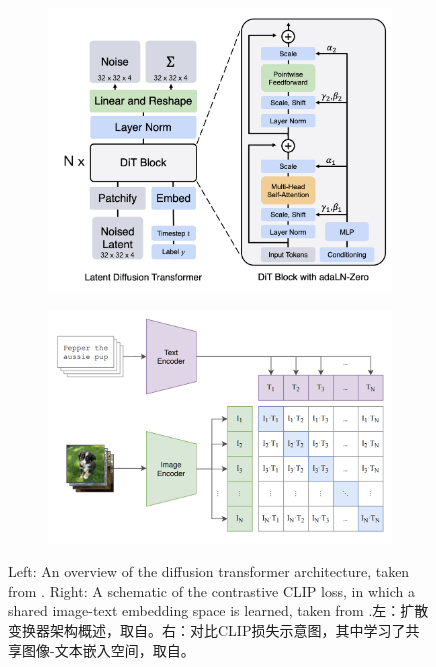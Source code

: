 \begin{figure}[!t]
\centering
\begin{subfigure}{.5\textwidth}
  \centering
  \includegraphics[width=0.95\linewidth]{figures/dit.png}
  \label{fig:sub1}
\end{subfigure}%
\begin{subfigure}{.5\textwidth}
  \centering
  \includegraphics[width=0.95\linewidth]{figures/clip.png}
  \label{fig:sub2}
\end{subfigure}
\caption{Left: An overview of the diffusion transformer architecture, taken from \cite{dit}. Right: A schematic of the contrastive CLIP loss, in which a shared image-text embedding space is learned, taken from \cite{clip}.左：扩散变换器架构概述，取自\cite{dit}。右：对比CLIP损失示意图，其中学习了共享图像-文本嵌入空间，取自\cite{clip}。}
\label{fig:test}
\end{figure}


